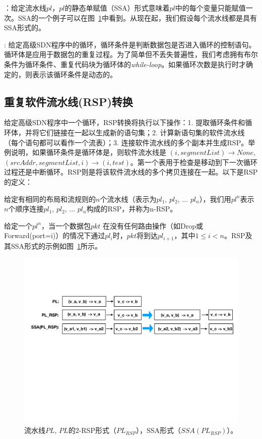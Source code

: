 ：给定流水线$pl$，$pl$的静态单赋值（SSA）形式意味着$pl$中的每个变量只能赋值一次。SSA的一个例子可以在图~\ref{fig:pipelines}中看到。从现在起，我们假设每个流水线都是具有SSA形式的。

: 给定高级SDN程序中的循环，循环条件是判断数据包是否进入循环的控制语句。循环体是应用于数据包的重复过程。为了简单但不丢失普遍性，我们考虑拥有布尔条件为循环条件、重复代码块为循环体的\emph{while-loop}。如果循环次数是执行时才确定的，则表示该循环条件是动态的。

\subsection{重复软件流水线(RSP)转换}

给定高级SDN程序中一个循环，RSP转换将执行以下操作：1. 提取循环条件和循环体，并将它们链接在一起以生成新的语句集；2. 计算新语句集的软件流水线（每个语句都可以看作一个流表）；3. 连接软件流水线的多个副本并生成RSP。举例说明，如果循环条件是循环体是，则软件流水线是 $(i, segmentList) \rightarrow None$, $(srcAddr, segmentList, i) \rightarrow (i, test)$。第一个表用于检查是移动到下一次循环过程还是中断循环。RSP则是将该软件流水线的多个拷贝连接在一起。以下是RSP的定义：

\begin{definition}
给定有相同的布局和流规则的$n$个流水线（表示为$pl_1$, $pl_2$, ... $pl_n$），我们用$pl^n$表示$n$个顺序连接$pl_1$, $pl_2$, ... $pl_n$构成的RSP，并称为n-RSP。
\end{definition}

给定一个$pl^n$，当一个数据包$pkt$ 在没有任何路由操作（如Drop或Forward(port=i)）的情况下通过$pl_i$时，$pkt$将到达$pl_{i+1}$，其中$1 \leq i < n$。RSP及其SSA形式的示例如图~\ref{fig:pipelines}所示。

\begin{figure}[!htbp]
\includegraphics[width=0.8\linewidth]{figures/lp-66.pdf}
\centering
\vspace{-3mm}
\caption{\small 流水线$PL$, $PL$的2-RSP形式（$PL_{RSP}$），SSA形式（$SSA(PL_{RSP})$）。}
\label{fig:pipelines}
\end{figure}

